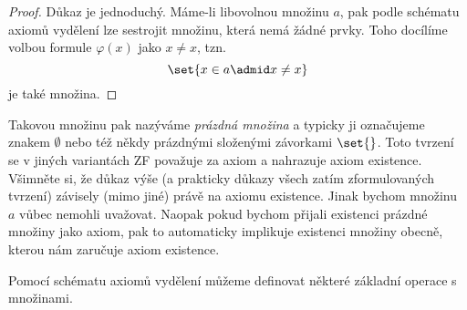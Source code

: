 \begin{proof}
    Důkaz je jednoduchý. Máme-li libovolnou množinu $a$, pak podle schématu axiomů vydělení lze sestrojit množinu, která nemá žádné prvky. Toho docílíme volbou formule $\varphi(x)$ jako $x\neq x$, tzn.
    \begin{equation*}
        \set{x\in a \admid x\neq x}
    \end{equation*}
    je také množina.
\end{proof}
Takovou množinu pak nazýváme \emph{prázdná množina} a typicky ji označujeme znakem $\emptyset$ nebo též někdy prázdnými složenými závorkami $\set{}$. Toto tvrzení se v jiných variantách ZF považuje za axiom a nahrazuje axiom existence. Všimněte si, že důkaz výše (a prakticky důkazy všech zatím zformulovaných tvrzení) závisely (mimo jiné) právě na axiomu existence. Jinak bychom množinu $a$ vůbec nemohli uvažovat. Naopak pokud bychom přijali existenci prázdné množiny jako axiom, pak to automaticky implikuje existenci množiny obecně, kterou nám zaručuje axiom existence.\par
Pomocí schématu axiomů vydělení můžeme definovat některé základní operace s množinami.